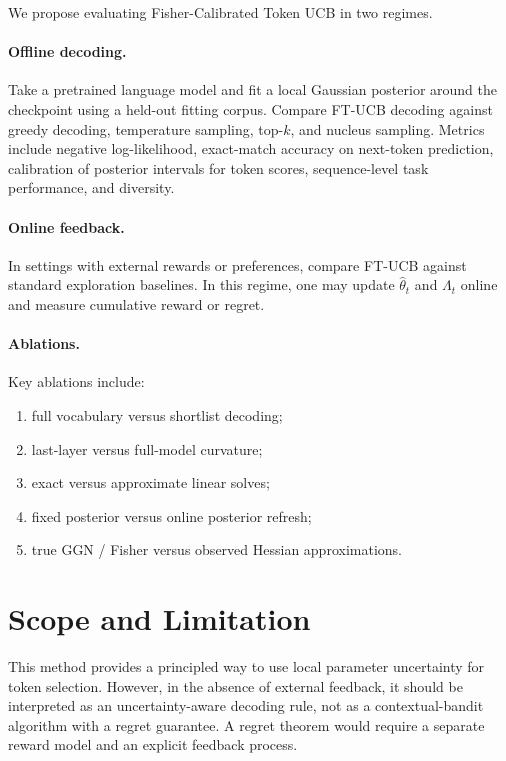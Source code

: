 \documentclass[11pt]{article}
\begin{document}
We propose evaluating Fisher-Calibrated Token UCB in two regimes.

\paragraph{Offline decoding.}
Take a pretrained language model and fit a local Gaussian posterior
around the checkpoint using a held-out fitting corpus.
Compare FT-UCB decoding against greedy decoding, temperature sampling,
top-$k$, and nucleus sampling.
Metrics include negative log-likelihood, exact-match accuracy on next-token
prediction, calibration of posterior intervals for token scores,
sequence-level task performance, and diversity.

\paragraph{Online feedback.}
In settings with external rewards or preferences, compare FT-UCB against
standard exploration baselines.
In this regime, one may update $\hat\theta_t$ and $\Lambda_t$ online and
measure cumulative reward or regret.

\paragraph{Ablations.}
Key ablations include:
\begin{enumerate}[leftmargin=1.5em]
\item full vocabulary versus shortlist decoding;
\item last-layer versus full-model curvature;
\item exact versus approximate linear solves;
\item fixed posterior versus online posterior refresh;
\item true GGN / Fisher versus observed Hessian approximations.
\end{enumerate}

\section{Scope and Limitation}

This method provides a principled way to use local parameter uncertainty
for token selection.
However, in the absence of external feedback, it should be interpreted as
an uncertainty-aware decoding rule, not as a contextual-bandit algorithm
with a regret guarantee.
A regret theorem would require a separate reward model and an explicit
feedback process.
\end{document}
